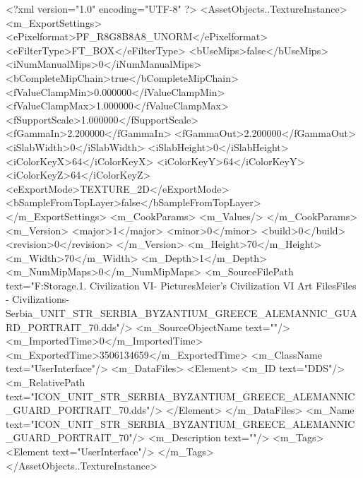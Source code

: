 <?xml version="1.0" encoding="UTF-8" ?>
<AssetObjects..TextureInstance>
	<m_ExportSettings>
		<ePixelformat>PF_R8G8B8A8_UNORM</ePixelformat>
		<eFilterType>FT_BOX</eFilterType>
		<bUseMips>false</bUseMips>
		<iNumManualMips>0</iNumManualMips>
		<bCompleteMipChain>true</bCompleteMipChain>
		<fValueClampMin>0.000000</fValueClampMin>
		<fValueClampMax>1.000000</fValueClampMax>
		<fSupportScale>1.000000</fSupportScale>
		<fGammaIn>2.200000</fGammaIn>
		<fGammaOut>2.200000</fGammaOut>
		<iSlabWidth>0</iSlabWidth>
		<iSlabHeight>0</iSlabHeight>
		<iColorKeyX>64</iColorKeyX>
		<iColorKeyY>64</iColorKeyY>
		<iColorKeyZ>64</iColorKeyZ>
		<eExportMode>TEXTURE_2D</eExportMode>
		<bSampleFromTopLayer>false</bSampleFromTopLayer>
	</m_ExportSettings>
	<m_CookParams>
		<m_Values/>
	</m_CookParams>
	<m_Version>
		<major>1</major>
		<minor>0</minor>
		<build>0</build>
		<revision>0</revision>
	</m_Version>
	<m_Height>70</m_Height>
	<m_Width>70</m_Width>
	<m_Depth>1</m_Depth>
	<m_NumMipMaps>0</m_NumMipMaps>
	<m_SourceFilePath text="F:\Mod Storage\2.1. Civilization VI\Mods\Archive - Pictures\Sid Meier's Civilization VI Art Files\Art Files - Civilizations\Civilization - Serbia\ICON_UNIT_STR_SERBIA_BYZANTIUM_GREECE_ALEMANNIC_GUARD_PORTRAIT_70.dds"/>
	<m_SourceObjectName text=""/>
	<m_ImportedTime>0</m_ImportedTime>
	<m_ExportedTime>3506134659</m_ExportedTime>
	<m_ClassName text="UserInterface"/>
	<m_DataFiles>
		<Element>
			<m_ID text="DDS"/>
			<m_RelativePath text="ICON_UNIT_STR_SERBIA_BYZANTIUM_GREECE_ALEMANNIC_GUARD_PORTRAIT_70.dds"/>
		</Element>
	</m_DataFiles>
	<m_Name text="ICON_UNIT_STR_SERBIA_BYZANTIUM_GREECE_ALEMANNIC_GUARD_PORTRAIT_70"/>
	<m_Description text=""/>
	<m_Tags>
		<Element text="UserInterface"/>
	</m_Tags>
</AssetObjects..TextureInstance>

